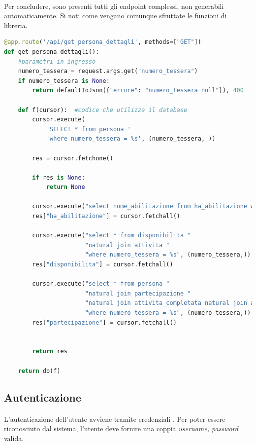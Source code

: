 \documentclass[11pt,a4paper,english]{article}
\begin{document}
\paragraph{} Per concludere, sono presenti tutti gli endpoint complessi, non generabili automaticamente. Si noti come vengano comunque sfruttate le funzioni di libreria.

\begin{lstlisting}[language=python, caption=Esempio di endpoint non generabile]
@app.route('/api/get_persona_dettagli', methods=["GET"])
def get_persona_dettagli():
    #parametri in ingresso
    numero_tessera = request.args.get("numero_tessera")
    if numero_tessera is None:
        return defaultToJson({"errore": "numero_tessera null"}), 400

    def f(cursor):  #codice che utilizza il database
        cursor.execute(
            'SELECT * from persona '
            'where numero_tessera = %s', (numero_tessera, ))

        res = cursor.fetchone()

        if res is None:
            return None

        cursor.execute("select nome_abilitazione from ha_abilitazione where numero_tessera = %s", (numero_tessera, ))
        res["ha_abilitazione"] = cursor.fetchall()

        cursor.execute("select * from disponibilita "
                       "natural join attivita "
                       "where numero_tessera = %s", (numero_tessera,))
        res["disponibilita"] = cursor.fetchall()

        cursor.execute("select * from persona "
                       "natural join partecipazione "
                       "natural join attivita_completata natural join attivita "
                       "where numero_tessera = %s", (numero_tessera,))
        res["partecipazione"] = cursor.fetchall()


        return res

    return do(f)
\end{lstlisting}

\subsection{Autenticazione}

\paragraph{} L'autenticazione dell'utente avviene tramite credenziali \cite{password}. Per poter essere riconosciuto dal sistema, l'utente deve fornire una coppia \emph{username, password} valida. 
\end{document}

